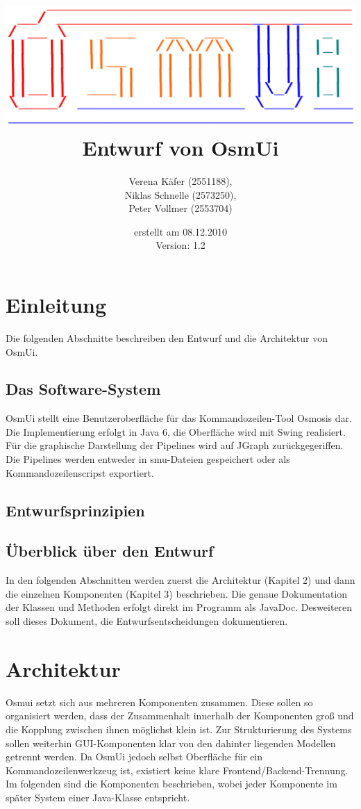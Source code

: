 \documentclass[a4paper,12pt]{scrartcl}
\author{
Verena Käfer (2551188),\\
Niklas Schnelle (2573250),\\
Peter Vollmer (2553704)}
\date{erstellt am 08.12.2010\\
Version: 1.2}
\title{\includegraphics[width=15cm]{../projektplan/Logo_Osmui.png} \\ 
Entwurf von OsmUi}
\begin{document}
\maketitle
\newpage
\tableofcontents
\newpage

\section{Einleitung}
Die folgenden Abschnitte beschreiben den Entwurf und die Architektur von OsmUi.
\subsection{Das Software-System}
OsmUi stellt eine Benutzeroberfläche für das Kommandozeilen-Tool Osmosis dar. Die Implementierung erfolgt in Java 6, die Oberfläche wird mit Swing realisiert. Für die graphische Darstellung der Pipelines wird auf JGraph zurückgegeriffen. Die Pipelines werden entweder in smu-Dateien gespeichert oder als Kommandozeilenscripst exportiert.
\subsection{Entwurfsprinzipien}

\subsection{Überblick über den Entwurf}
In den folgenden Abschnitten werden zuerst die Architektur (Kapitel 2) und dann die einzelnen Komponenten (Kapitel 3) beschrieben. Die genaue Dokumentation der Klassen und Methoden erfolgt direkt im Programm als JavaDoc. Desweiteren soll dieses Dokument, die Entwurfsentscheidungen dokumentieren.

\section{Architektur}
Osmui setzt sich aus mehreren Komponenten zusammen. Diese sollen so organisiert werden, dass der Zusammenhalt innerhalb der Komponenten groß und die Kopplung zwischen ihnen möglichst klein ist. Zur Strukturierung des Systems sollen weiterhin GUI-Komponenten klar von den dahinter liegenden Modellen getrennt werden. Da OsmUi jedoch selbst Oberfläche für ein Kommandozeilenwerkzeug ist, existiert keine klare Frontend/Backend-Trennung.\\
Im folgenden sind die Komponenten beschrieben, wobei jeder Komponente im später System einer Java-Klasse entspricht.
\end{document}
